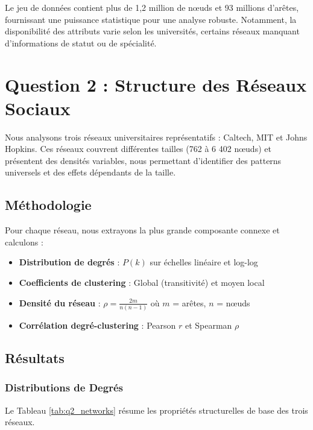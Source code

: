 \documentclass[12pt,a4paper]{article}
\begin{document}
Le jeu de données contient plus de 1,2 million de nœuds et 93 millions d'arêtes, fournissant une puissance statistique pour une analyse robuste. Notamment, la disponibilité des attributs varie selon les universités, certains réseaux manquant d'informations de statut ou de spécialité.

\section{Question 2 : Structure des Réseaux Sociaux}

Nous analysons trois réseaux universitaires représentatifs : Caltech, MIT et Johns Hopkins. Ces réseaux couvrent différentes tailles (762 à 6 402 nœuds) et présentent des densités variables, nous permettant d'identifier des patterns universels et des effets dépendants de la taille.

\subsection{Méthodologie}

Pour chaque réseau, nous extrayons la plus grande composante connexe et calculons :
\begin{itemize}
    \item \textbf{Distribution de degrés} : $P(k)$ sur échelles linéaire et log-log
    \item \textbf{Coefficients de clustering} : Global (transitivité) et moyen local
    \item \textbf{Densité du réseau} : $\rho = \frac{2m}{n(n-1)}$ où $m$ = arêtes, $n$ = nœuds
    \item \textbf{Corrélation degré-clustering} : Pearson $r$ et Spearman $\rho$
\end{itemize}

\subsection{Résultats}

\subsubsection{Distributions de Degrés}

Le Tableau \ref{tab:q2_networks} résume les propriétés structurelles de base des trois réseaux.
\end{document}
